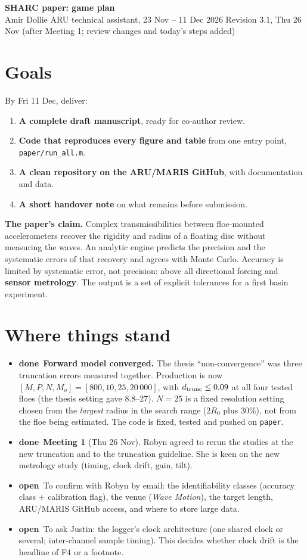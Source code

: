 \documentclass[10pt,a4paper]{article}
\newcommand{\DONE}{\textcolor{done}{\textbf{done}}}
\newcommand{\OPEN}{\textcolor{open}{\textbf{open}}}
\begin{document}
{\Large\bfseries\color{ocean} SHARC paper: game plan}\\[2pt]
{\small Amir Dollie \quad ARU technical assistant, 23 Nov -- 11 Dec 2026 \quad Revision 3.1, Thu 26 Nov (after Meeting 1; review changes and today's steps added)}

\section{Goals}
By Fri 11 Dec, deliver:
\begin{enumerate}
\item \textbf{A complete draft manuscript}, ready for co-author review.
\item \textbf{Code that reproduces every figure and table} from one entry point, \texttt{paper/run\_all.m}.
\item \textbf{A clean repository on the ARU/MARIS GitHub}, with documentation and data.
\item \textbf{A short handover note} on what remains before submission.
\end{enumerate}
\textbf{The paper's claim.} Complex transmissibilities between floe-mounted accelerometers recover the rigidity and radius of a floating disc without measuring the waves. An analytic engine predicts the precision and the systematic errors of that recovery and agrees with Monte Carlo. Accuracy is limited by systematic error, not precision: above all directional forcing and \textbf{sensor metrology}. The output is a set of explicit tolerances for a first basin experiment.

\section{Where things stand}
\begin{itemize}
\item \DONE\ \textbf{Forward model converged.} The thesis ``non-convergence'' was three truncation errors measured together. Production is now $[M,P,N,M_o]=[800,10,25,20\,000]$, with $d_{\rm trunc}\le0.09$ at all four tested floes (the thesis setting gave 8.8--27). $N=25$ is a fixed resolution setting chosen from the \emph{largest} radius in the search range ($2R_0$ plus 30\%), not from the floe being estimated. The code is fixed, tested and pushed on \texttt{paper}.
\item \DONE\ \textbf{Meeting 1} (Thu 26 Nov). Robyn agreed to rerun the studies at the new truncation and to the truncation guideline. She is keen on the new metrology study (timing, clock drift, gain, tilt).
\item \OPEN\ To confirm with Robyn by email: the identifiability classes (accuracy class + calibration flag), the venue (\emph{Wave Motion}), the target length, ARU/MARIS GitHub access, and where to store large data.
\item \OPEN\ To ask Justin: the logger's clock architecture (one shared clock or several; inter-channel sample timing). This decides whether clock drift is the headline of F4 or a footnote.
\end{itemize}
\end{document}
